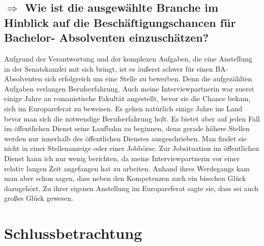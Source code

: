 \documentclass[12pt,headsepline,a4paper]{scrartcl}
\newcommand\quest[1]{\subsection*{$\Rightarrow$ #1}}
\begin{document}
\quest{Wie ist die ausgewählte Branche im Hinblick auf die Beschäftigungschancen für Bachelor- Absolventen einzuschätzen?}
Aufgrund der Verantwortung und der komplexen Aufgaben, die eine Anstellung in der Senatskanzlei mit sich bringt, ist es äußerst schwer für einen BA- Absolventen sich erfolgreich um eine Stelle zu bewerben.
Denn die aufgezählten Aufgaben verlangen Berufserfahrung. Auch meine Interviewpartnerin war zuerst einige Jahre an romanistische Fakultät angestellt, bevor sie die Chance bekam, sich im Europareferat zu beweisen. Es gehen natürlich einige Jahre ins Land  bevor man sich die notwendige Berufserfahrung holt. Es bietet aber auf jeden Fall im öffentlichen Dienst seine Laufbahn zu beginnen, denn gerade höhere Stellen werden nur innerhalb des öffentlichen Dienstes ausgeschrieben. Man findet sie nicht in einer Stellenanzeige oder einer Jobbörse.
Zur Jobsituation im öffentlichen Dienst kann ich nur wenig berichten, da meine Interviewpartnerin vor einer relativ langen Zeit angefangen hat zu arbeiten. Anhand ihres Werdegangs kam man aber schon sagen, dass neben den Kompetenzen auch ein bisschen Glück dazugehört. Zu ihrer eigenen Anstellung im Europareferat sagte sie, dass sei auch großes Glück gewesen.  


\section{Schlussbetrachtung}
\end{document}
